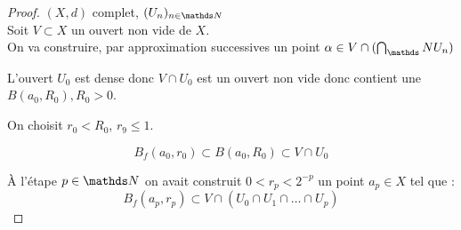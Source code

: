 \begin{proof}
  $(X,d)$ complet, $(U_n)_{n\in\NN}$\\
  Soit $V\subset X$ un ouvert non vide de $X$.\\
  On va construire, par approximation successives un point $\alpha\in V\cap(\bigcap_\NN U_n)$
  
  L'ouvert $U_0$ est dense donc $V\cap U_0$ est un ouvert non vide donc contient une $B(a_0, R_0), R_0>0$.

  On choisit $r_0 < R_0$, $r_9 \leq 1$.

  $$B_f(a_0, r_0)\subset B(a_0, R_0)\subset V\cap U_0$$

  \`A l'étape $p\in\NN$ on avait construit $0<r_p<2^{-p}$ un point $a_p\in X$ tel que :
  \[B_f(a_p, r_p) \subset V\cap (U_0\cap U_1 \cap \dots \cap U_p) \]
\end{proof}
